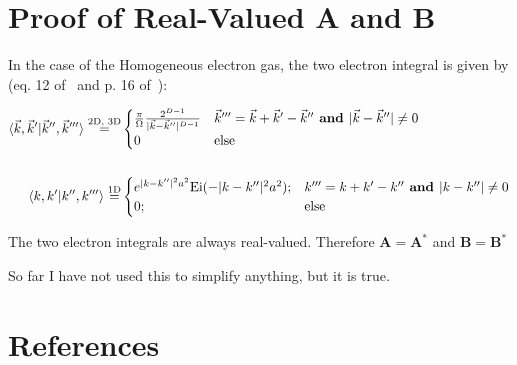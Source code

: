\documentclass{revtex4}
\begin{document}
\section{Proof of Real-Valued A and B}
In the case of the Homogeneous electron gas,
the two electron integral is given by
(eq. 12 of~\cite{Delyon2008} and p. 16 of~\cite{Guiliani2005}):

\begin{subequations}
\begin{align}
\braket{\vec{k}, \vec{k}'|\vec{k}'',\vec{k} '''}\stackrel{\text{2D, 3D}}{=}&
	\begin{cases}
	\frac{\pi}{\Omega}\frac{2^{D-1}}{|\vec{k}-\vec{k}''|^{D-1}}
	& \vec{k}''' = \vec{k}+\vec{k}'-\vec{k}'' \textbf{ and } |\vec{k}-\vec{k}''| \neq 0 \\
	0
	& \text{else}
	\end{cases}
\\ \nonumber \\
\braket{k, k'|k'',k'''}\stackrel{\text{1D}}{=}&
	\begin{cases}
	e^{|k-k''|^2a^2}\text{Ei}(-|k-k''|^2a^2)\text{;}
	& k''' = k + k'-k'' \textbf{ and } |k-k''| \neq 0 \\
	0\text{;}
	& \text{else}
	\end{cases}
\end{align}
\end{subequations}

The two electron integrals are always real-valued. Therefore
$\mathbf{A} = \mathbf{A}^*$ and $\mathbf{B} = \mathbf{B}^*$

So far I have not used this to simplify anything, but it is true.

\section{References}

\end{document}
